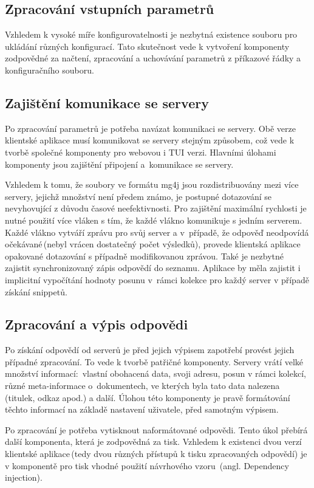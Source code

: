 \subsection*{Zpracování vstupních parametrů}
Vzhledem k vysoké míře konfigurovatelnosti je nezbytná existence souboru pro ukládání různých  konfigurací. Tato skutečnost vede k vytvoření komponenty zodpovědné za načtení, zpracování a uchovávání parametrů z příkazové řádky a konfiguračního souboru.


\subsection*{Zajištění komunikace se servery}
Po zpracování parametrů je potřeba navázat komunikaci se servery.  Obě verze klientské aplikace musí komunikovat se servery stejným způsobem, což vede k tvorbě společné komponenty pro webovou i TUI verzi. Hlavními úlohami komponenty jsou zajištění připojení a~komunikace se servery.

Vzhledem k tomu, že soubory ve formátu mg4j jsou rozdistribuovány mezi více servery, jejichž množství není předem známo, je postupné dotazování se nevyhovující z důvodu časové neefektivnosti. Pro zajištění maximální rychlosti je nutné použití více vláken s tím, že každé vlákno komunikuje s jedním serverem. Každé vlákno vytváří zprávu pro svůj server a v~případě, že odpověď neodpovídá očekávané\,(nebyl vrácen dostatečný počet výsledků), provede klientská aplikace  opakované dotazování s případně modifikovanou zprávou. Také je nezbytné zajistit synchronizovaný zápis odpovědí do seznamu. Aplikace by měla zajistit i implicitní vypočítání hodnoty posunu v~rámci kolekce pro každý server v případě získání  snippetů.

\subsection*{Zpracování a výpis odpovědi}
Po získání odpovědí od serverů je před jejich výpisem zapotřebí provést jejich případné zpracování. To vede k tvorbě patřičné komponenty. Servery vrátí velké množství informací:~vlastní obohacená data, svoji adresu, posun v rámci kolekcí, různé meta-informace o~dokumentech, ve kterých byla tato data nalezena\,(titulek, odkaz apod.) a další. Úlohou této komponenty je pravě formátování těchto informací na základě nastavení uživatele, před samotným výpisem.


Po zpracování je potřeba vytisknout naformátované odpovědi. Tento úkol přebírá další komponenta, která je zodpovědná za tisk. Vzhledem k existenci dvou verzí klientské aplikace\,(tedy dvou různých přístupů k tisku zpracovaných odpovědí) je v komponentě pro tisk vhodné použití návrhového vzoru \,(angl. Dependency injection). 



